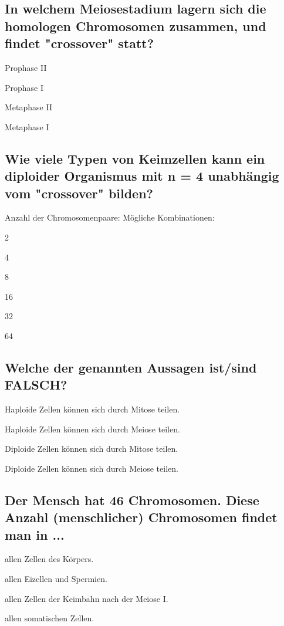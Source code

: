 \documentclass{article}
\begin{document}
\subsection*{In welchem Meiosestadium lagern sich die homologen Chromosomen zusammen, und findet "crossover" statt?}
\begin{todolist} %
\item Prophase II  
\item  Prophase I
\item Metaphase II  
\item Metaphase I  
\end{todolist}
\subsection*{Wie viele Typen von Keimzellen kann ein diploider Organismus mit n = 4
unabhängig vom "crossover" bilden?}
Anzahl der Chromosomenpaare:  \newline
Mögliche Kombinationen: 
\begin{todolist} %
\item 2
\item  4
\item 8
\item 16
\item 32
\item 64
\end{todolist}
\subsection*{Welche der genannten Aussagen ist/sind FALSCH?}
\begin{todolist} %
\item Haploide Zellen können sich durch Mitose teilen.  
\item  Haploide Zellen können sich durch Meiose teilen.  
\item Diploide Zellen können sich durch Mitose teilen.  
\item Diploide Zellen können sich durch Meiose teilen.  
\end{todolist}
\subsection*{Der Mensch hat 46 Chromosomen. Diese Anzahl (menschlicher)
Chromosomen findet man in ...}
\begin{todolist} %
\item allen Zellen des Körpers.  
\item allen Eizellen und Spermien.  
\item allen Zellen der Keimbahn nach der Meiose I.  
\item  allen somatischen Zellen.
\end{todolist}
\end{document}
